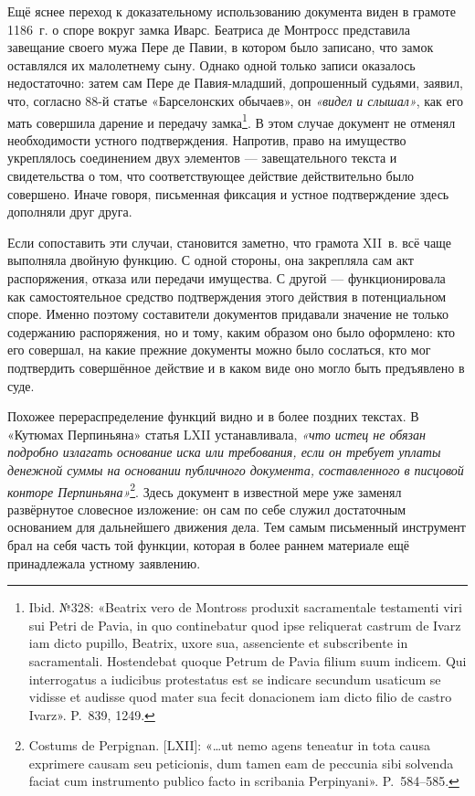 Ещё яснее переход к доказательному использованию документа виден в грамоте 1186~г. о споре вокруг замка Иварс. Беатриса де Монтросс представила завещание своего мужа Пере де Павии, в котором было записано, что замок оставлялся их малолетнему сыну. Однако одной только записи оказалось недостаточно: затем сам Пере де Павия-младший, допрошенный судьями, заявил, что, согласно 88-й статье «Барселонских обычаев», он \emph{«видел и слышал»}, как его мать совершила дарение и передачу замка\footnote{Ibid. №328: «Beatrix vero de Montross produxit sacramentale testamenti viri sui Petri de Pavia, in quo continebatur quod ipse reliquerat castrum de Ivarz iam dicto pupillo, Beatrix, uxore sua, assenciente et subscribente in sacramentali. Hostendebat quoque Petrum de Pavia filium suum indicem. Qui interrogatus a iudicibus protestatus est se indicare secundum usaticum se vidisse et audisse quod mater sua fecit donacionem iam dicto filio de castro Ivarz». P.~839, 1249.}. В этом случае документ не отменял необходимости устного подтверждения. Напротив, право на имущество укреплялось соединением двух элементов --- завещательного текста и свидетельства о том, что соответствующее действие действительно было совершено. Иначе говоря, письменная фиксация и устное подтверждение здесь дополняли друг друга.

Если сопоставить эти случаи, становится заметно, что грамота XII~в. всё чаще выполняла двойную функцию. С одной стороны, она закрепляла сам акт распоряжения, отказа или передачи имущества. С другой --- функционировала как самостоятельное средство подтверждения этого действия в потенциальном споре. Именно поэтому составители документов придавали значение не только содержанию распоряжения, но и тому, каким образом оно было оформлено: кто его совершал, на какие прежние документы можно было сослаться, кто мог подтвердить совершённое действие и в каком виде оно могло быть предъявлено в суде.

Похожее перераспределение функций видно и в более поздних текстах. В «Кутюмах Перпиньяна» статья LXII устанавливала, \emph{«что истец не обязан подробно излагать основание иска или требования, если он требует уплаты денежной суммы на основании публичного документа, составленного в писцовой конторе Перпиньяна»}\footnote{Costums de Perpignan. [LXII]: «…ut nemo agens teneatur in tota causa exprimere causam seu peticionis, dum tamen eam de peccunia sibi solvenda faciat cum instrumento publico facto in scribania Perpinyani». P.~584--585.}. Здесь документ в известной мере уже заменял развёрнутое словесное изложение: он сам по себе служил достаточным основанием для дальнейшего движения дела. Тем самым письменный инструмент брал на себя часть той функции, которая в более раннем материале ещё принадлежала устному заявлению.

